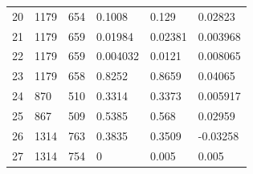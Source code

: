 \documentclass[conference]{IEEEtran}
\begin{document}
\begin{table}[!t]
\begin{tabular}{l|lllll}
20 & 1179           & 654            & 0.1008        & 0.129         & 0.02823   \\
21 & 1179           & 659            & 0.01984       & 0.02381       & 0.003968  \\
22 & 1179           & 659            & 0.004032      & 0.0121        & 0.008065  \\
23 & 1179           & 658            & 0.8252        & 0.8659        & 0.04065   \\
24 & 870            & 510            & 0.3314        & 0.3373        & 0.005917  \\
25 & 867            & 509            & 0.5385        & 0.568         & 0.02959   \\
26 & 1314           & 763            & 0.3835        & 0.3509        & -0.03258  \\
27 & 1314           & 754            & 0             & 0.005         & 0.005    
\end{tabular}
\end{table}




%
%

\end{document}
